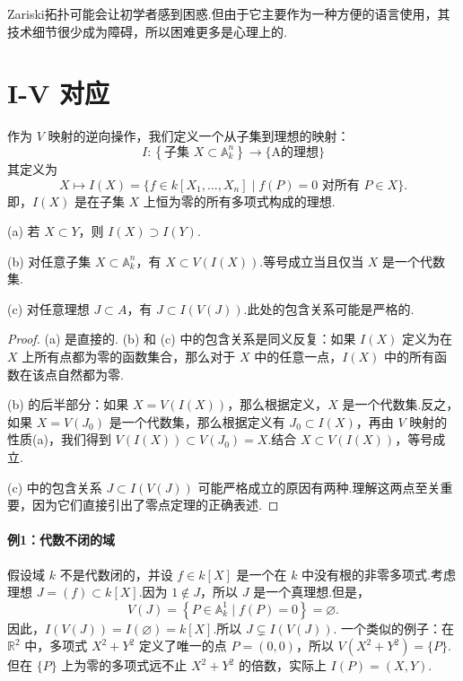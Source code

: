 Zariski拓扑可能会让初学者感到困惑.但由于它主要作为一种方便的语言使用，其技术细节很少成为障碍，所以困难更多是心理上的.

\section{I-V 对应}

作为 \(V\) 映射的逆向操作，我们定义一个从子集到理想的映射：
\[
I: \left\{  {\text{子集 }X \subset  {\mathbb{A}}_{k}^{n}}\right\} \to \{ \text{A的理想} \}
\]
其定义为
\[
X \mapsto I\left( X\right)  = \{ f \in  k\left\lbrack  X_1, \ldots, X_n \right\rbrack   \mid  f\left( P\right)  = 0 \text{ 对所有 } P \in  X\} .
\]
即，\(I(X)\) 是在子集 \(X\) 上恒为零的所有多项式构成的理想.

\begin{proposition}
(a) 若 \(X \subset  Y\)，则 \(I\left( X\right)  \supset  I\left( Y\right)\).

(b) 对任意子集 \(X \subset  {\mathbb{A}}_{k}^{n}\)，有 \(X \subset  V\left( {I\left( X\right) }\right)\).等号成立当且仅当 \(X\) 是一个代数集.

(c) 对任意理想 \(J \subset  A\)，有 \(J \subset  I\left( {V\left( J\right) }\right)\).此处的包含关系可能是严格的.
\end{proposition}

\begin{proof}
(a) 是直接的.
(b) 和 (c) 中的包含关系是同义反复：如果 \(I(X)\) 定义为在 \(X\) 上所有点都为零的函数集合，那么对于 \(X\) 中的任意一点，\(I(X)\) 中的所有函数在该点自然都为零.

(b) 的后半部分：如果 \(X = V\left( {I\left( X\right) }\right)\)，那么根据定义，\(X\) 是一个代数集.反之，如果 \(X = V\left( {J_0}\right)\) 是一个代数集，那么根据定义有 \(J_0 \subset I(X)\)，再由 \(V\) 映射的性质(a)，我们得到 \(V(I(X)) \subset V(J_0) = X\).结合 \(X \subset V(I(X))\)，等号成立.

(c) 中的包含关系 \(J \subset  I\left( {V\left( J\right) }\right)\) 可能严格成立的原因有两种.理解这两点至关重要，因为它们直接引出了零点定理的正确表述.
\end{proof}

\paragraph{例1：代数不闭的域} 假设域 \(k\) 不是代数闭的，并设 \(f \in  k\left\lbrack  X\right\rbrack\) 是一个在 \(k\) 中没有根的非零多项式.考虑理想 \(J = \left( f\right)  \subset  k\left\lbrack  X\right\rbrack\).因为 \(1 \notin  J\)，所以 \(J\) 是一个真理想.但是，
\[
V\left( J\right)  = \left\{  {P \in  {\mathbb{A}}_{k}^{1} \mid  f\left( P\right)  = 0}\right\}   = \varnothing .
\]
因此，\(I\left( {V\left( J\right) }\right) = I(\varnothing) = k\left\lbrack  X\right\rbrack\).所以 \(J \subsetneq I(V(J))\).
一个类似的例子：在 \({\mathbb{R}}^{2}\) 中，多项式 \({X}^{2} + {Y}^{2}\) 定义了唯一的点 \(P = \left( {0,0}\right)\)，所以 \(V\left( {{X}^{2} + {Y}^{2}}\right)  = \{ P\}\).但在 \(\{ P\}\) 上为零的多项式远不止 \({X}^{2} + {Y}^{2}\) 的倍数，实际上 \(I\left( P\right)  = \left( {X,Y}\right)\).

